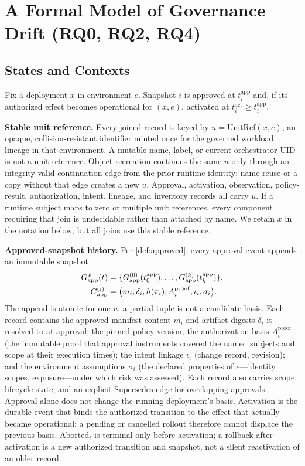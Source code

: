 \section{A Formal Model of Governance Drift (RQ0, RQ2, RQ4)}
\label{sec:model}

\subsection{States and Contexts}
\label{sec:model-states}

Fix a deployment $x$ in environment $e$. Snapshot $i$ is approved at
$t_i^{\mathrm{app}}$ and, if its authorized effect becomes operational for
$(x,e)$, activated at $t_i^{\mathrm{act}}\geq t_i^{\mathrm{app}}$.

\textbf{Stable unit reference.} Every joined record is keyed by
$u=\mathrm{UnitRef}(x,e)$, an opaque, collision-resistant identifier minted
once for the governed workload lineage in that environment. A mutable name,
label, or current orchestrator UID is not a unit reference. Object recreation
continues the same $u$ only through an integrity-valid continuation edge from
the prior runtime identity; name reuse or a copy without that edge creates a
new $u$. Approval, activation, observation, policy-result, authorization,
intent, lineage, and inventory records all carry $u$. If a runtime subject
maps to zero or multiple unit references, every component requiring that join
is undecidable rather than attached by name. We retain $x$ in the notation
below, but all joins use this stable reference.

\textbf{Approved-snapshot history.} Per \cref{def:approved}, every approval
event appends an immutable snapshot
\[
\begin{aligned}
G_{\mathrm{app}}^{x}(t)&=\{G_{\mathrm{app}}^{(0)}(t_0^{\mathrm{app}}),\ldots,
G_{\mathrm{app}}^{(k)}(t_k^{\mathrm{app}})\},\\
G_{\mathrm{app}}^{(i)}&=\bigl(m_i,\delta_i,h(\pi_i),A_i^{\mathrm{proof}},
\iota_i,\sigma_i\bigr).
\end{aligned}
\]
The append is atomic for one $u$: a partial tuple is not a candidate basis.
Each record contains the approved manifest content $m_i$ and artifact digests $\delta_i$ it
resolved to at approval; the pinned policy version; the authorization basis
$A_i^{\mathrm{proof}}$ (the immutable proof that approval instruments covered
the named subjects and scope at their execution times); the intent linkage $\iota_i$ (change
record, revision); and the environment assumptions $\sigma_i$ (the declared
properties of $e$---identity scopes, exposure---under which risk was
assessed). Each record also carries scope, lifecycle state, and an explicit
$\mathrm{Supersedes}$ edge for overlapping approvals. Approval alone does not
change the running deployment's basis. Activation is the durable event that
binds the authorized transition to the effect that actually became
operational; a pending or cancelled rollout therefore cannot displace the
previous basis. $\mathrm{Aborted}_i$ is terminal only before activation; a
rollback after activation is a new authorized transition and snapshot, not a
silent reactivation of an older record.

